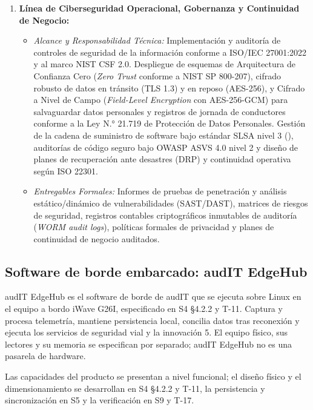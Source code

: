 \begin{enumerate}
  \item \textbf{Línea de Ciberseguridad Operacional, Gobernanza y Continuidad de Negocio:}
  \begin{itemize}
    \item \textit{Alcance y Responsabilidad Técnica:} Implementación y auditoría de controles de seguridad de la información conforme a ISO/IEC 27001:2022 y al marco NIST CSF 2.0. Despliegue de esquemas de Arquitectura de Confianza Cero (\textit{Zero Trust} conforme a NIST SP 800-207), cifrado robusto de datos en tránsito (TLS 1.3) y en reposo (AES-256), y Cifrado a Nivel de Campo (\textit{Field-Level Encryption} con AES-256-GCM) para salvaguardar datos personales y registros de jornada de conductores conforme a la Ley N.° 21.719 de Protección de Datos Personales. Gestión de la cadena de suministro de software bajo estándar SLSA nivel 3 (), auditorías de código seguro bajo OWASP ASVS 4.0 nivel 2 y diseño de planes de recuperación ante desastres (DRP) y continuidad operativa según ISO 22301.
    \item \textit{Entregables Formales:} Informes de pruebas de penetración y análisis estático/dinámico de vulnerabilidades (SAST/DAST), matrices de riesgos de seguridad, registros contables criptográficos inmutables de auditoría (\textit{WORM audit logs}), políticas formales de privacidad y planes de continuidad de negocio auditados.
  \end{itemize}
\end{enumerate}

\subsection{Software de borde embarcado: audIT EdgeHub}\label{sec:1-edgehub}

audIT EdgeHub es el software de borde de audIT que se ejecuta sobre Linux en el equipo a bordo iWave G26I, especificado en S4 §4.2.2 y T-11. Captura y procesa telemetría, mantiene persistencia local, concilia datos tras reconexión y ejecuta los servicios de seguridad vial y la innovación 5. El equipo físico, sus lectores y su memoria se especifican por separado; audIT EdgeHub no es una pasarela de hardware.

Las capacidades del producto se presentan a nivel funcional; el diseño físico y el dimensionamiento se desarrollan en S4 §4.2.2 y T-11, la persistencia y sincronización en S5 y la verificación en S9 y T-17.

